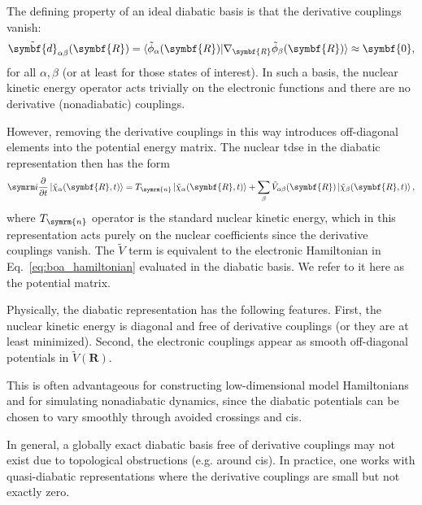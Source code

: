 The defining property of an ideal diabatic basis is that the derivative couplings vanish:
\begin{equation}
\tilde{\symbf{d}}_{\alpha\beta}(\symbf{R})=\braket{\tilde\phi_\alpha(\symbf{R})\vert\nabla_{\symbf{R}}\tilde\phi_\beta(\symbf{R})}\approx\symbf{0},
\end{equation}
for all $\alpha,\beta$ (or at least for those states of interest). In such a basis, the nuclear kinetic energy operator acts trivially on the electronic functions and there are no derivative (nonadiabatic) couplings.

However, removing the derivative couplings in this way introduces off-diagonal elements into the potential energy matrix. The nuclear \gls{tdse} in the diabatic representation then has the form
\begin{equation}
\i\frac{\partial}{\partial{t}}\ket{\tilde\chi_\alpha(\symbf{R},t)}=T_{\symrm{n}}\ket{\tilde\chi_\alpha(\symbf{R},t)}+\sum_\beta\tilde{V}_{\alpha\beta}(\symbf{R})\ket{\tilde\chi_\beta(\symbf{R},t)},
\end{equation}
where $T_{\symrm{n}}$ operator is the standard nuclear kinetic energy, which in this representation acts purely on the nuclear coefficients since the derivative couplings vanish. The $\tilde{V}$ term is equivalent to the electronic Hamiltonian in Eq.~\eqref{eq:boa_hamiltonian} evaluated in the diabatic basis. We refer to it here as the potential matrix.

Physically, the diabatic representation has the following features. First, the nuclear kinetic energy is diagonal and free of derivative couplings (or they are at least minimized). Second, the electronic couplings appear as smooth off-diagonal potentials in $\tilde{V}(\symbf{R})$.

This is often advantageous for constructing low-dimensional model Hamiltonians and for simulating nonadiabatic dynamics, since the diabatic potentials can be chosen to vary smoothly through avoided crossings and \glspl{ci}.

In general, a globally exact diabatic basis free of derivative couplings may not exist due to topological obstructions (e.g. around \glspl{ci}). In practice, one works with quasi-diabatic representations where the derivative couplings are small but not exactly zero.
